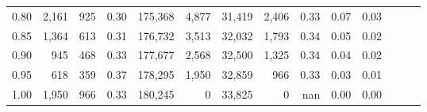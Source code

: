 \begin{tabular}{rrrrrrrrrrrrrr}
0.80 &   2,161 &    925 &  0.30 &  175,368 &    4,877 &  31,419 &   2,406 &  0.33 &  0.07 &      0.03 \\
0.85 &   1,364 &    613 &  0.31 &  176,732 &    3,513 &  32,032 &   1,793 &  0.34 &  0.05 &      0.02 \\
0.90 &     945 &    468 &  0.33 &  177,677 &    2,568 &  32,500 &   1,325 &  0.34 &  0.04 &      0.02 \\
0.95 &     618 &    359 &  0.37 &  178,295 &    1,950 &  32,859 &     966 &  0.33 &  0.03 &      0.01 \\
1.00 &   1,950 &    966 &  0.33 &  180,245 &        0 &  33,825 &       0 &   nan &  0.00 &      0.00 \\
\bottomrule
\end{tabular}
